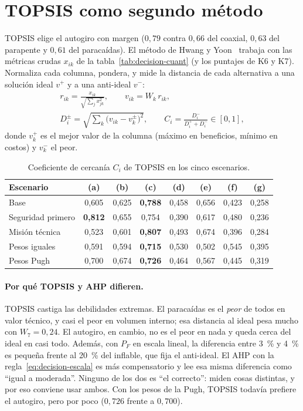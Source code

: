 \section{TOPSIS como segundo método}\label{sec:decision-topsis}
TOPSIS elige el autogiro con margen ($0{,}79$ contra $0{,}66$ del coaxial, $0{,}63$ del
parapente y $0{,}61$ del paracaídas). El método de Hwang y Yoon~\cite{decision-hwang1981} trabaja con las
métricas crudas $x_{ik}$ de la tabla~\ref{tab:decision-cuant} (y los puntajes de K6 y
K7). Normaliza cada columna, pondera, y mide la distancia de cada alternativa a una
solución ideal $v^+$ y a una anti-ideal $v^-$:
\begin{gather}
  r_{ik}=\frac{x_{ik}}{\sqrt{\sum_j x_{jk}^2}},\qquad v_{ik}=W_k\,r_{ik},\\
  D_i^{\pm}=\sqrt{\sum_k\big(v_{ik}-v_k^{\pm}\big)^2},\qquad
  C_i=\frac{D_i^-}{D_i^++D_i^-}\in[0,1],
  \label{eq:decision-topsis}
\end{gather}
donde $v_k^+$ es el mejor valor de la columna (máximo en beneficios, mínimo en costos) y
$v_k^-$ el peor.

\begin{table}[H]
\centering\small
\caption{Coeficiente de cercanía $C_i$ de TOPSIS en los cinco escenarios.}
\label{tab:decision-topsis}
\begin{tabular}{@{}l*{7}{c}@{}}
\toprule
Escenario & (a) & (b) & (c) & (d) & (e) & (f) & (g)\\\midrule
Base              & 0,605 & 0,625 & \textbf{0,788} & 0,458 & 0,656 & 0,423 & 0,258\\
Seguridad primero & \textbf{0,812} & 0,655 & 0,754 & 0,390 & 0,617 & 0,480 & 0,236\\
Misión técnica    & 0,523 & 0,601 & \textbf{0,807} & 0,493 & 0,674 & 0,396 & 0,284\\
Pesos iguales     & 0,591 & 0,594 & \textbf{0,715} & 0,530 & 0,502 & 0,545 & 0,395\\
Pesos Pugh        & 0,700 & 0,674 & \textbf{0,726} & 0,464 & 0,567 & 0,445 & 0,319\\
\bottomrule
\end{tabular}
\end{table}

\paragraph{Por qué TOPSIS y AHP difieren.} TOPSIS castiga las debilidades extremas. El
paracaídas es el \emph{peor} de todos en valor técnico, y casi el peor en volumen
interno; esa distancia al ideal pesa mucho con $W_7=0{,}24$. El autogiro, en cambio,
no es el peor en nada y queda cerca del ideal en casi todo. Además, con $P_F$ en escala
lineal, la diferencia entre \SI{3}{\percent} y \SI{4}{\percent} es pequeña frente al
\SI{20}{\percent} del inflable, que fija el anti-ideal. El AHP con
la regla~\eqref{eq:decision-escala} es más compensatorio y lee esa misma diferencia como
``igual a moderada''. Ninguno de los dos es ``el correcto'': miden cosas
distintas, y por eso conviene usar ambos. Con los pesos de la Pugh, TOPSIS todavía
prefiere el autogiro, pero por poco ($0{,}726$ frente a $0{,}700$).

